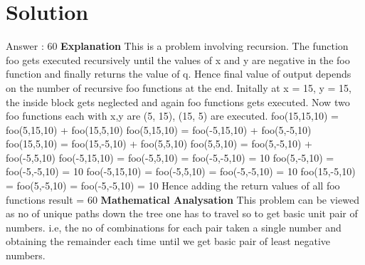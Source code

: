 \documentclass[journal,12pt,twocolumn]{IEEEtran}
\begin{document}
\section{Solution}
Answer : 60
\newline
\newline
\textbf{Explanation}
\newline
\newline
This is a problem involving recursion.
The function foo gets executed recursively until the values of x and y are negative in the foo function and finally returns the value of q. Hence final value of output depends on the number of recursive foo functions at the end. 
\newline
\newline
\newline
\newline
\newline
\newline
Initally at x = 15, y = 15, the inside block gets neglected and again foo functions gets executed.
\newline
\newline
Now two foo functions each with x,y are (5, 15),  (15, 5) are executed.
foo(15,15,10) =  foo(5,15,10) + foo(15,5,10)
\newline
\newline
foo(5,15,10)   =  foo(-5,15,10) + foo(5,-5,10)
\newline
\newline
foo(15,5,10)   =  foo(15,-5,10) + foo(5,5,10)
\newline
\newline
foo(5,5,10)  =  foo(5,-5,10) + foo(-5,5,10)
\newline
\newline
foo(-5,15,10)   =  foo(-5,5,10) = foo(-5,-5,10) = 10
\newline
\newline
foo(5,-5,10)   =  foo(-5,-5,10)  = 10
\newline
\newline
foo(-5,15,10)  = foo(-5,5,10)  = foo(-5,-5,10) = 10
\newline
\newline
foo(15,-5,10)  = foo(5,-5,10)  = foo(-5,-5,10) = 10
\newline
\newline
Hence adding the return values of all foo functions result = 60
\newline
\newline
\textbf{Mathematical Analysation}
\newline
\newline
This problem can be viewed as no of unique paths down the tree one has to travel so to get basic unit pair of numbers. i.e, the no of combinations for each pair taken a single number and obtaining the remainder each time until we get basic pair of least negative numbers.
\end{document}
